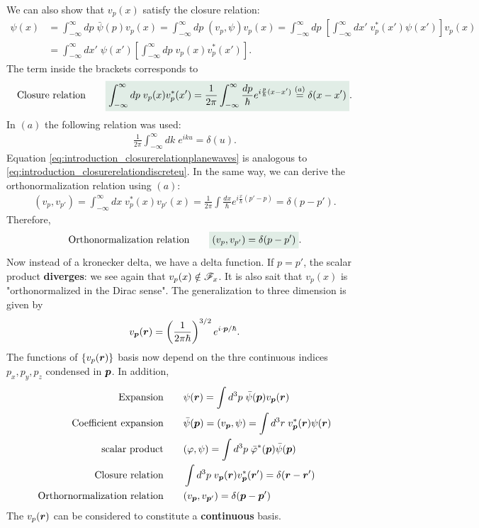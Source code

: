 We can also show that $v_p(x)$ satisfy the closure relation:
{\small
\begin{align*}
    \psi(x)&=\int_{-\infty}^\infty dp\;\bar{\psi}(p)v_p(x)=\int_{-\infty}^\infty dp\;(v_p,\psi)v_p(x)=\int_{-\infty}^\infty dp\;\left[\int_{-\infty}^\infty dx'\;v_p^*(x')\psi(x')\right]v_p(x)\\
    &=\int_{-\infty}^\infty dx'\;\psi(x')\left[\int_{-\infty}^\infty dp\;v_p(x)v^*_p(x')\right].
\end{align*}}
The term inside the brackets corresponds to 
\begin{align}
    \text{Closure relation}\qquad\highlight{\int_{-\infty}^\infty dp\;v_p(x)v^*_p(x')=\frac{1}{2\pi}\int_{-\infty}^\infty\frac{dp}{\hbar}e^{i\frac{p}{\hbar}(x-x')}\stackrel{(a)}{=}\delta(x-x')}.
    \label{eq:introduction_closurerelationplanewaves}
\end{align}
In $(a)$ the following relation was used:
\begin{align*}
    \frac{1}{2\pi}\int_{-\infty}^\infty dk\;e^{iku}=\delta(u).
\end{align*}
Equation \eqref{eq:introduction_closurerelationplanewaves} is analogous to \eqref{eq:introduction_closurerelationdiscreteu}. In the same way, we can derive the orthonormalization relation using $(a)$:
\begin{align*}
    (v_p,v_{p'})=\int_{-\infty}^\infty dx\;v_p^*(x)v_{p'}(x)=\frac{1}{2\pi}\int\frac{dx}{\hbar}e^{i\frac{x}{\hbar}(p'-p)}=\delta(p-p').
\end{align*}
Therefore,
\begin{align}
    \text{Orthonormalization relation}\qquad \highlight{(v_p,v_{p'})=\delta(p-p')}.
    \label{eq:introduction_orthonormalizationrelationplanewaves}
\end{align}
Now instead of a kronecker delta, we have a delta function. If $p=p'$, the scalar product \textbf{diverges}: we see again that $v_p(x)\notin\mathscr{F}_x$. It is also sait that 
$v_p(x)$ is "orthonormalized in the Dirac sense". The generalization to three dimension is given by
\begin{align}
    v_{\bm{p}}(\bm{r})=\left(\frac{1}{2\pi\hbar}\right)^{3/2}e^{i\cdot\bm{p}/\hbar}.
\end{align}
The functions of $\{v_p(\bm{r})\}$ basis now depend on the thre continuous indices $p_x,p_y,p_z$ condensed in $\bm{p}$. In addition,
\begin{align}
    \text{Expansion}&\qquad\psi(\bm{r})=\int d^3p\;\bar{\psi}(\bm{p})v_{\bm{p}}(\bm{r})\\
    \text{Coefficient expansion}&\qquad\bar{\psi}(\bm{p})=(v_{\bm{p}},\psi)=\int d^3r\;v^*_{\bm{p}}(\bm{r})\psi(\bm{r})\\
    \text{scalar product}&\qquad(\varphi,\psi)=\int d^3p\;\bar{\varphi}^*(\bm{p})\bar{\psi}(\bm{p})\\
    \text{Closure relation}&\qquad\int d^3p\;v_{\bm{p}}(\bm{r})v^*_{\bm{p}}(\bm{r}')=\delta(\bm{r}-\bm{r}')\\
    \text{Orthornormalization relation}&\qquad(v_{\bm{p}},v_{\bm{p}'})=\delta(\bm{p}-\bm{p}')
\end{align}
The $v_p(\bm{r})$ can be considered to constitute a \textbf{continuous} basis.
